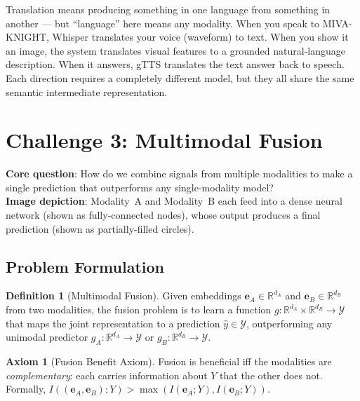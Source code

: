 \documentclass[12pt,a4paper]{article}
\theoremstyle{definition}
\newtheorem{definition}{Definition}[section]
\newtheorem{axiom}{Axiom}[section]
\theoremstyle{plain}
\theoremstyle{remark}
\newcommand{\R}{\mathbb{R}}
\newcommand{\eA}{\mathbf{e}_A}
\newcommand{\eB}{\mathbf{e}_B}
\begin{document}
\begin{tcolorbox}[laymanbox]
Translation means producing something in one language from something in another — but ``language'' here means any modality. When you speak to MIVA-KNIGHT, Whisper translates your voice (waveform) to text. When you show it an image, the system translates visual features to a grounded natural-language description. When it answers, gTTS translates the text answer back to speech. Each direction requires a completely different model, but they all share the same semantic intermediate representation.
\end{tcolorbox}

\newpage
\section{Challenge 3: Multimodal Fusion}
\label{sec:fusion}

\begin{tcolorbox}[challengebox,title={Challenge 3: Fusion}]
\textbf{Core question}: How do we combine signals from multiple modalities to make a single prediction that outperforms any single-modality model?\\[4pt]
\textbf{Image depiction}: Modality~A and Modality~B each feed into a dense neural network (shown as fully-connected nodes), whose output produces a final prediction (shown as partially-filled circles).
\end{tcolorbox}

\subsection{Problem Formulation}

\begin{definition}[Multimodal Fusion]
Given embeddings $\eA \in \R^{d_A}$ and $\eB \in \R^{d_B}$ from two modalities, the fusion problem is to learn a function $g : \R^{d_A} \times \R^{d_B} \to \mathcal{Y}$ that maps the joint representation to a prediction $\hat{y} \in \mathcal{Y}$, outperforming any unimodal predictor $g_A : \R^{d_A} \to \mathcal{Y}$ or $g_B : \R^{d_B} \to \mathcal{Y}$.
\end{definition}

\begin{axiom}[Fusion Benefit Axiom]
\label{ax:fusion}
Fusion is beneficial iff the modalities are \emph{complementary}: each carries information about $Y$ that the other does not. Formally, $I((\eA, \eB); Y) > \max(I(\eA; Y), I(\eB; Y))$.
\end{axiom}
\end{document}

